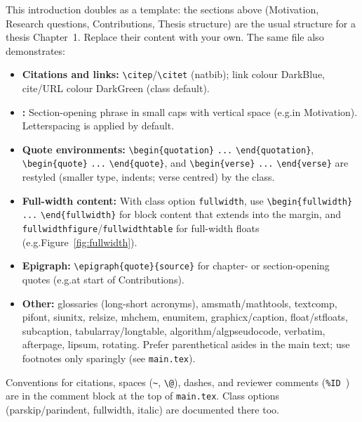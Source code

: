     This introduction doubles as a template: the sections above (Motivation, Research questions, Contributions, Thesis structure) are the usual structure for a thesis Chapter~1. Replace their content with your own. The same file also demonstrates:

    \begin{itemize}
        \item \textbf{Citations and links:} \verb|\citep|/\verb|\citet| (natbib); link colour DarkBlue, cite/URL colour DarkGreen (class default).
      \item \textbf{\texttt{\string\newthought}:} Section-opening phrase in small caps with vertical space (e.g.\@ in Motivation). Letterspacing is applied by default.
        \item \textbf{Quote environments:} \verb|\begin{quotation}| \verb|...| \verb|\end{quotation}|, \verb|\begin{quote}| \verb|...| \verb|\end{quote}|, and \verb|\begin{verse}| \verb|...| \verb|\end{verse}| are restyled (smaller type, indents; verse centred) by the class.
        \item \textbf{Full-width content:} With class option \texttt{fullwidth}, use \verb|\begin{fullwidth}| \verb|...| \verb|\end{fullwidth}| for block content that extends into the margin, and \texttt{fullwidthfigure}/\texttt{fullwidthtable} for full-width floats (e.g.\@ Figure~\ref{fig:fullwidth}).
        \item \textbf{Epigraph:} \verb|\epigraph{quote}{source}| for chapter- or section-opening quotes (e.g.\@ at start of Contributions).
      \item \textbf{Other:} glossaries (long-short acronyms), amsmath/mathtools, textcomp, pifont, siunitx, relsize, mhchem, enumitem, graphicx/caption, float/stfloats, subcaption, tabularray/longtable, algorithm/algpseudocode, verbatim, afterpage, lipsum, rotating. Prefer parenthetical asides in the main text; use footnotes only sparingly (see \texttt{main.tex}).
    \end{itemize}

    Conventions for citations, spaces (\verb|~|, \verb|\@|), dashes, and reviewer comments (\verb|%ID |) are in the comment block at the top of \texttt{main.tex}. Class options (parskip/parindent, fullwidth, italic) are documented there too.
